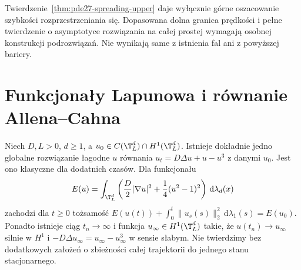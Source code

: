 \begin{uwaga}
Twierdzenie~\ref{thm:pde27-spreading-upper} daje wyłącznie
górne oszacowanie szybkości rozprzestrzeniania się.
Dopasowana dolna granica prędkości i pełne twierdzenie
o asymptotyce rozwiązania na całej prostej wymagają
osobnej konstrukcji podrozwiązań. Nie wynikają
same z istnienia fal ani z powyższej bariery.
\end{uwaga}

\section{Funkcjonały Lapunowa i równanie Allena--Cahna}
\begin{twierdzenie}
\label{thm:pde27-allen}
Niech $D,L>0$, $d\ge1$, a
$u_0\in C(\T_L^d)\cap H^1(\T_L^d)$.
Istnieje dokładnie jedno globalne rozwiązanie łagodne
$u$ równania $u_t=D\Delta u+u-u^3$ z danymi $u_0$.
Jest ono klasyczne dla dodatnich czasów.
Dla funkcjonału
\[
 E(u)=\int_{\T_L^d}\left(\frac D2|\nabla u|^2
 +\frac14(u^2-1)^2\right)\,\mathrm d\lambda_d(x)
\]
zachodzi dla $t\ge0$ tożsamość
$E(u(t))+\int_0^t\|u_s(s)\|_2^2\,\mathrm d\lambda_1(s)=E(u_0)$.
Ponadto istnieje ciąg $t_n\to\infty$ i funkcja
$u_\infty\in H^1(\T_L^d)$ takie, że
$u(t_n)\to u_\infty$ silnie w $H^1$ i
$-D\Delta u_\infty=u_\infty-u_\infty^3$
w sensie słabym. Nie twierdzimy bez dodatkowych
założeń o zbieżności całej trajektorii do jednego
stanu stacjonarnego.
\end{twierdzenie}
